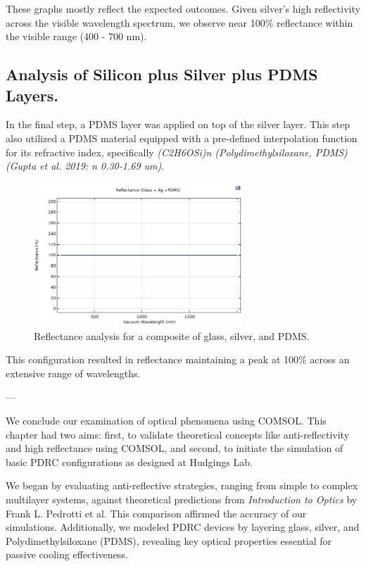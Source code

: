 These graphs mostly reflect the expected outcomes. Given silver's high reflectivity across the visible wavelength spectrum, we observe near 100\% reflectance within the visible range (400 - 700 nm).


\subsection{Analysis of Silicon plus Silver plus PDMS Layers.}
In the final step, a PDMS layer was applied on top of the silver layer. This step also utilized a PDMS material equipped with a pre-defined interpolation function for its refractive index, specifically \emph{(C2H6OSi)n (Polydimethylsiloxane, PDMS) (Gupta et al. 2019: n 0.30-1.69 um)}.

\begin{figure}[H]
  \centering
  \includegraphics[width=0.7\textwidth]{Chapters/Figures/Chapter 4 Figures/Reflectance Results (Glass + Ag + PDMS).png}
  \caption{Reflectance analysis for a composite of glass, silver, and PDMS.}
  \label{fig:Reflectance analysis for glass, silver, and PDMS}
\end{figure}

This configuration resulted in reflectance maintaining a peak at 100\% across an extensive range of wavelengths.


---


We conclude our examination of optical phenomena using COMSOL. This chapter had two aims: first, to validate theoretical concepts like anti-reflectivity and high reflectance using COMSOL, and second, to initiate the simulation of basic PDRC configurations as designed at Hudgings Lab.

We began by evaluating anti-reflective strategies, ranging from simple to complex multilayer systems, against theoretical predictions from \emph{Introduction to Optics} by Frank L. Pedrotti et al. This comparison affirmed the accuracy of our simulations. Additionally, we modeled PDRC devices by layering glass, silver, and Polydimethylsiloxane (PDMS), revealing key optical properties essential for passive cooling effectiveness.


